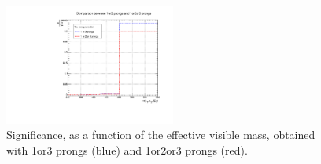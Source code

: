 
 \begin{tiny} 
 \begin{table}[ht] 
 \caption{Signal and background yields obtained requiring 1or3-prongs and 
 1or2or3-prongs in the tau identification. The significance was estimated for 
  \mass~$>~$600\GeV. \label{tab:prongsappendix} }
 \end{table} 
 \end{tiny} 


\begin{figure}[ht]
\begin{center}
\captionsetup[subfloat]{farskip=0pt,captionskip=0.0cm,labelformat=empty}
\includegraphics[clip,width=0.5\textwidth]{figuras/AppendiceB/2prongs/prongsComparison.pdf}
 \caption{Significance, as a function of the effective visible mass, obtained 
 with 1or3 prongs (blue) and 1or2or3 prongs (red). \label{fig:prongsappendix}}
\end{center}
\end{figure}

